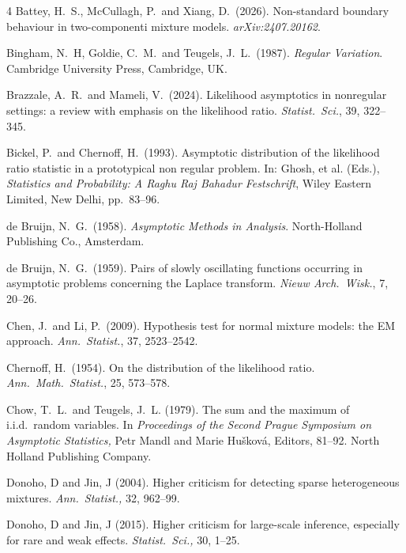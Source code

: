 \documentclass[11pt]{article}
\theoremstyle{definition}
\begin{document}
\begin{thebibliography}{4}
	Battey, H.~S., McCullagh, P.~and Xiang, D.~(2026). Non-standard boundary behaviour in two-componenti mixture models.
	\emph{arXiv:2407.20162}.
    
	Bingham, N.~H, Goldie, C.~M.~and Teugels, J.~L.~(1987).
	\textit{Regular Variation}. Cambridge University Press, Cambridge, UK.

	
	Brazzale, A.~R.~and Mameli, V.~(2024). Likelihood asymptotics in nonregular settings: a review with emphasis on the likelihood ratio.
	\emph{Statist.~Sci.}, 39, 322--345.
	
	Bickel, P.~and Chernoff, H.~(1993). Asymptotic distribution of the likelihood ratio statistic in a prototypical non regular problem. In: Ghosh, et al. (Eds.), \emph{Statistics and Probability: A Raghu Raj Bahadur Festschrift}, Wiley Eastern Limited, New Delhi, pp.~83--96.

	de Bruijn, N.~G.~(1958). \emph{Asymptotic Methods in Analysis}. North-Holland Publishing Co., Amsterdam.
    
	
	de Bruijn, N.~G.~(1959). Pairs of slowly oscillating functions occurring in asymptotic problems concerning the Laplace transform.
	\emph{Nieuw Arch.~Wisk.}, 7, 20--26.
	
	Chen, J.~and Li, P.~(2009).
	Hypothesis test for normal mixture models: the EM approach.
	\textit{Ann.~Statist.}, 37, 2523--2542.
	
	
	Chernoff, H.~(1954).
	On the distribution of the likelihood ratio.
	\textit{Ann.~Math.~Statist.}, 25, 573--578.
	
	
	Chow, T.~L.~and Teugels, J.~L. (1979).
	The sum and the maximum of i.i.d.~random variables.
	In \emph{Proceedings of the Second Prague Symposium on Asymptotic Statistics,}
	Petr Mandl and Marie Hu\v{s}kov\'a, Editors, 81--92.
	North Holland Publishing Company.


    Donoho, D and Jin, J (2004).
    Higher criticism for detecting sparse heterogeneous mixtures.
    \emph{Ann.~Statist.,} 32, 962--99.

    Donoho, D and Jin, J (2015).
    Higher criticism for large-scale inference, especially for rare and weak effects. \emph{Statist.~Sci.,} 30, 1--25.


\end{thebibliography}
\end{document}
